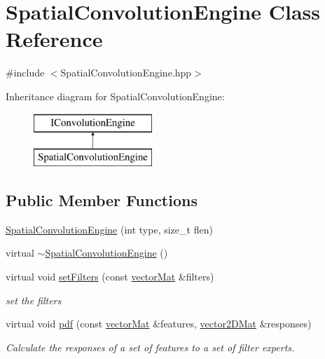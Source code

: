 \hypertarget{classSpatialConvolutionEngine}{\section{Spatial\-Convolution\-Engine Class Reference}
\label{classSpatialConvolutionEngine}
}


{\ttfamily \#include $<$Spatial\-Convolution\-Engine.\-hpp$>$}

Inheritance diagram for Spatial\-Convolution\-Engine\-:\begin{figure}[H]
\begin{center}
\leavevmode
\includegraphics[height=2.000000cm]{classSpatialConvolutionEngine}
\end{center}
\end{figure}
\subsection*{Public Member Functions}
\begin{DoxyCompactItemize}
\item 
\hyperlink{classSpatialConvolutionEngine_a934e9613ba487297befd6e064bbd5d7a}{Spatial\-Convolution\-Engine} (int type, size\-\_\-t flen)
\item 
virtual \hyperlink{classSpatialConvolutionEngine_a07b28be0c28a1c47bc6f2a7459155802}{$\sim$\-Spatial\-Convolution\-Engine} ()
\item 
virtual void \hyperlink{classSpatialConvolutionEngine_ad27aad7b65dfa3ec6a617eed96c01d9c}{set\-Filters} (const \hyperlink{types_8hpp_a3207a7addcfa415d1c83622febcb1e9b}{vector\-Mat} \&filters)
\begin{DoxyCompactList}\small\item\em set the filters \end{DoxyCompactList}\item 
virtual void \hyperlink{classSpatialConvolutionEngine_a6db3b5e9428ee74e1b4e9e7f7111cad5}{pdf} (const \hyperlink{types_8hpp_a3207a7addcfa415d1c83622febcb1e9b}{vector\-Mat} \&features, \hyperlink{types_8hpp_a33cacb85be7b8df3dc0b67d5d849f4cc}{vector2\-D\-Mat} \&responses)
\begin{DoxyCompactList}\small\item\em Calculate the responses of a set of features to a set of filter experts. \end{DoxyCompactList}\end{DoxyCompactItemize}
